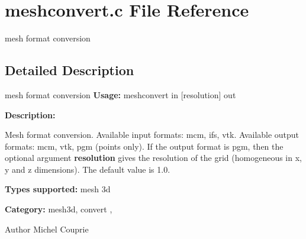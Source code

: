\section{meshconvert.c File Reference}
\label{meshconvert_8c}


mesh format conversion  




\subsection{Detailed Description}
mesh format conversion {\bfseries Usage:} meshconvert in [resolution] out

{\bfseries Description:}

Mesh format conversion. Available input formats: mcm, ifs, vtk. Available output formats: mcm, vtk, pgm (points only). If the output format is pgm, then the optional argument {\bfseries resolution} gives the resolution of the grid (homogeneous in x, y and z dimensions). The default value is 1.0.

{\bfseries Types supported:} mesh 3d

{\bfseries Category:} mesh3d, convert ,

\begin{DoxyAuthor}{Author}
Michel Couprie 
\end{DoxyAuthor}
